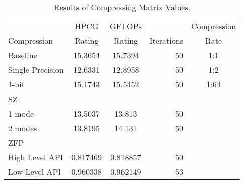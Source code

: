 \begin{table}
	\centering
	\begin{tabular}{l|S[table-format=2.6]|S[table-format=2.6]|r|c}
		            & {HPCG}   & {GFLOPs} &            & Compression \\
		Compression & {Rating} & {Rating} & Iterations & Rate \\
		\hline
		Baseline & 15.3654 & 15.7394 & 50 & 1:1 \\ %
		Single Precision & 12.6331 & 12.8958 & 50 & 1:2 \\
		1-bit & 15.1743 & 15.5452 & 50 & 1:64 \\ %
		SZ & & & & \\
		\hspace{3mm} 1 mode & 13.5037 & 13.813 & 50 & \\
		\hspace{3mm} 2 modes & 13.8195 & 14.131 & 50 & \\
		ZFP & & & & \\
		\hspace{3mm}High Level API & 0.817469 & 0.818857 & 50 & \\
		\hspace{3mm}Low Level API & 0.960338 & 0.962149 & 53 & \\
	\end{tabular}
	\caption{Results of Compressing Matrix Values.}
	\label{tab:results-val}
\end{table}
